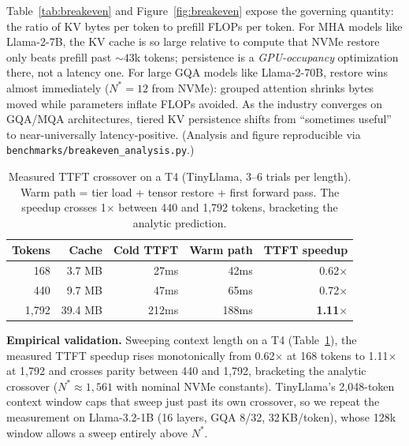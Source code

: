 \documentclass[letterpaper,twocolumn,10pt]{article}
\begin{document}
Table~\ref{tab:breakeven} and Figure~\ref{fig:breakeven} expose the governing quantity: the ratio of KV bytes per token to prefill FLOPs per token. For MHA models like Llama-2-7B, the KV cache is so large relative to compute that NVMe restore only beats prefill past ${\sim}43$k tokens; persistence is a \emph{GPU-occupancy} optimization there, not a latency one. For large GQA models like Llama-2-70B, restore wins almost immediately ($N^{*}{=}12$ from NVMe): grouped attention shrinks bytes moved while parameters inflate FLOPs avoided. As the industry converges on GQA/MQA architectures, tiered KV persistence shifts from ``sometimes useful'' to near-universally latency-positive. (Analysis and figure reproducible via \texttt{benchmarks/breakeven\_analysis.py}.)

\begin{table}[t]
\centering
\caption{Measured TTFT crossover on a T4 (TinyLlama, 3--6 trials per length). Warm path = tier load + tensor restore + first forward pass. The speedup crosses 1$\times$ between 440 and 1,792 tokens, bracketing the analytic prediction.}
\label{tab:t4sweep}
\small
\setlength{\tabcolsep}{3pt}
\begin{tabular}{@{}rrrrr@{}}
\toprule
Tokens & Cache & Cold TTFT & Warm path & TTFT speedup \\
\midrule
168   & 3.7 MB  & 27ms  & 42ms  & 0.62$\times$ \\
440   & 9.7 MB  & 47ms  & 65ms  & 0.72$\times$ \\
1,792 & 39.4 MB & 212ms & 188ms & \textbf{1.11$\times$} \\
\bottomrule
\end{tabular}
\end{table}

\textbf{Empirical validation.} Sweeping context length on a T4 (Table~\ref{tab:t4sweep}), the measured TTFT speedup rises monotonically from 0.62$\times$ at 168 tokens to 1.11$\times$ at 1,792 and crosses parity between 440 and 1,792, bracketing the analytic crossover ($N^{*}{\approx}1{,}561$ with nominal NVMe constants). TinyLlama's 2,048-token context window caps that sweep just past its own crossover, so we repeat the measurement on Llama-3.2-1B (16 layers, GQA 8/32, 32\,KB/token), whose 128k window allows a sweep entirely above $N^{*}$.
\end{document}
